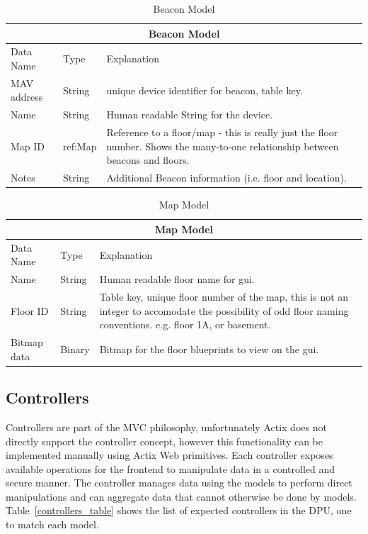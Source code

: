 \begin{table}[H]
\centering
\def\arraystretch{1.4}
\begin{tabular}{ | m{3cm} | m{3cm} | m{9.5cm} |}
	\hline
	\multicolumn{3}{|c|}{Beacon Model} \\
		\hline
	Data Name & Type & Explanation \\
	\hline
	MAV address & String & unique device identifier for beacon, table key.\\
	\hline
	Name & String & Human readable String for the device. \\
	\hline
	Map ID & ref:Map & Reference to a floor/map - this is really just the floor number. Shows the many-to-one relationship between beacons and floors. \\
	\hline
	Notes & String & Additional Beacon information (i.e. floor and location). \\
	\hline
\end{tabular}
\caption{Beacon Model}
\label{beacon_model}
\end{table}

\begin{table}[H]
\centering
\def\arraystretch{1.4}
\begin{tabular}{| m{3cm} | m{3cm} | m{9.5cm} |}
	\hline
	\multicolumn{3}{|c|}{Map Model} \\
	\hline
	Data Name & Type & Explanation \\
	\hline
	Name & String & Human readable floor name for gui. \\
	\hline
	Floor ID & String & Table key, unique floor number of the map, this is not an integer to accomodate the possibility of odd floor naming conventions. e.g. floor 1A, or basement. \\
	\hline
	Bitmap data & Binary & Bitmap for the floor blueprints to view on the gui. \\
	\hline
\end{tabular}
\caption{Map Model}
\label{map_model}
\end{table}

\pagebreak
\subsection{Controllers}
\medskip
Controllers are part of the MVC philosophy, unfortunately Actix does not directly support the controller concept, however this functionality can be implemented manually using Actix Web primitives.
Each controller exposes available operations for the frontend to manipulate data in a controlled and secure manner.
The controller manages data using the models to perform direct manipulations and can aggregate data that cannot otherwise be done by models.
Table~\ref{controllers_table} shows the list of expected controllers in the DPU, one to match each model.

